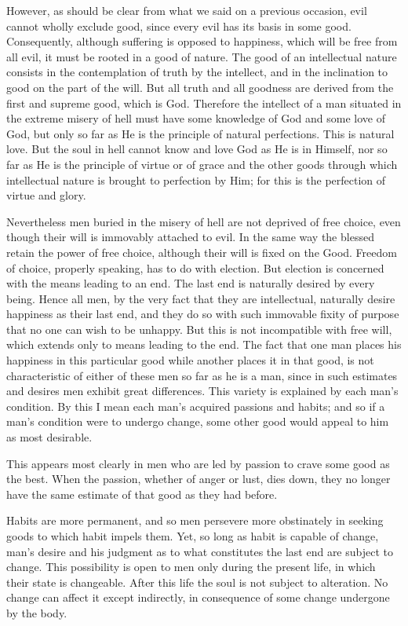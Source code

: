 \documentclass[10pt,article,twoside]{memoir}
\begin{document}
\begin{multicols}{2}
	However, as should be clear from what we said on a previous occasion, evil cannot wholly exclude good, since every evil has its basis in some good. Consequently, although suffering is opposed to happiness, which will be free from all evil, it must be rooted in a good of nature. The good of an intellectual nature consists in the contemplation of truth by the intellect, and in the inclination to good on the part of the will. But all truth and all goodness are derived from the first and supreme good, which is God. Therefore the intellect of a man situated in the extreme misery of hell must have some knowledge of God and some love of God, but only so far as He is the principle of natural perfections. This is natural love. But the soul in hell cannot know and love God as He is in Himself, nor so far as He is the principle of virtue or of grace and the other goods through which intellectual nature is brought to perfection by Him; for this is the perfection of virtue and glory.
	
	Nevertheless men buried in the misery of hell are not deprived of free choice, even though their will is immovably attached to evil. In the same way the blessed retain the power of free choice, although their will is fixed on the Good. Freedom of choice, properly speaking, has to do with election. But election is concerned with the means leading to an end. The last end is naturally desired by every being. Hence all men, by the very fact that they are intellectual, naturally desire happiness as their last end, and they do so with such immovable fixity of purpose that no one can wish to be unhappy. But this is not incompatible with free will, which extends only to means leading to the end. The fact that one man places his happiness in this particular good while another places it in that good, is not characteristic of either of these men so far as he is a man, since in such estimates and desires men exhibit great differences. This variety is explained by each man’s condition. By this I mean each man’s acquired passions and habits; and so if a man’s condition were to undergo change, some other good would appeal to him as most desirable.
	
	This appears most clearly in men who are led by passion to crave some good as the best. When the passion, whether of anger or lust, dies down, they no longer have the same estimate of that good as they had before.
	
	Habits are more permanent, and so men persevere more obstinately in seeking goods to which habit impels them. Yet, so long as habit is capable of change, man’s desire and his judgment as to what constitutes the last end are subject to change. This possibility is open to men only during the present life, in which their state is changeable. After this life the soul is not subject to alteration. No change can affect it except indirectly, in consequence of some change undergone by the body.
	

\end{multicols}
\end{document}
